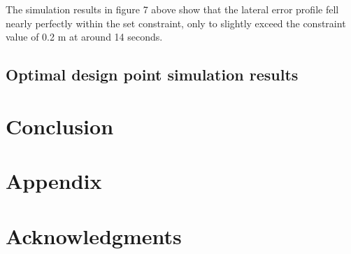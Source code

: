 \documentclass[conf]{new-aiaa}
\begin{document}
The simulation results in figure 7 above show that the lateral error profile fell nearly perfectly within the set constraint, only to slightly exceed the constraint value of 0.2 m at around 14 seconds.

\subsection{Optimal design point simulation results}

\section{Conclusion}


\section*{Appendix}


\section*{Acknowledgments}



\end{document}
